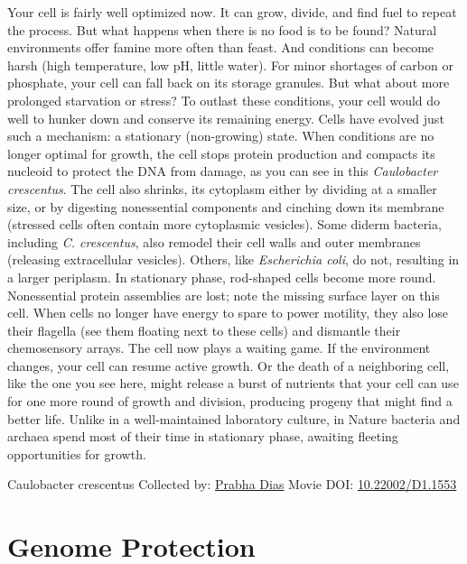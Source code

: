 \documentclass[]{tufte-book}
\begin{document}
Your cell is fairly well optimized now. It can grow, divide, and find fuel to repeat the process. But what happens when there is no food is to be found? Natural environments offer famine more often than feast. And conditions can become harsh (high temperature, low pH, little water). For minor shortages of carbon or phosphate, your cell can fall back on its storage granules. But what about more prolonged starvation or stress? To outlast these conditions, your cell would do well to hunker down and conserve its remaining energy. Cells have evolved just such a mechanism: a stationary (non-growing) state. When conditions are no longer optimal for growth, the cell stops protein production and compacts its nucleoid to protect the DNA from damage, as you can see in this \emph{Caulobacter crescentus}. The cell also shrinks, its cytoplasm either by dividing at a smaller size, or by digesting nonessential components and cinching down its membrane (stressed cells often contain more cytoplasmic vesicles). Some diderm bacteria, including \emph{C. crescentus}, also remodel their cell walls and outer membranes (releasing extracellular vesicles). Others, like \emph{Escherichia coli}, do not, resulting in a larger periplasm. In stationary phase, rod-shaped cells become more round. Nonessential protein assemblies are lost; note the missing surface layer on this cell. When cells no longer have energy to spare to power motility, they also lose their flagella (see them floating next to these cells) and dismantle their chemosensory arrays. The cell now plays a waiting game. If the environment changes, your cell can resume active growth. Or the death of a neighboring cell, like the one you see here, might release a burst of nutrients that your cell can use for one more round of growth and division, producing progeny that might find a better life. Unlike in a well-maintained laboratory culture, in Nature bacteria and archaea spend most of their time in stationary phase, awaiting fleeting opportunities for growth.



\hypertarget{htmlwidget-8b1243950da89c65e548}{}

\label{fig:8-1}Caulobacter crescentus Collected by: \protect\hyperlink{prabha_dias}{Prabha Dias} Movie DOI: \href{https://doi.org/10.22002/D1.1553}{10.22002/D1.1553}

\hypertarget{genome-protection}{%
\section{Genome Protection}\label{genome-protection}}
\end{document}

